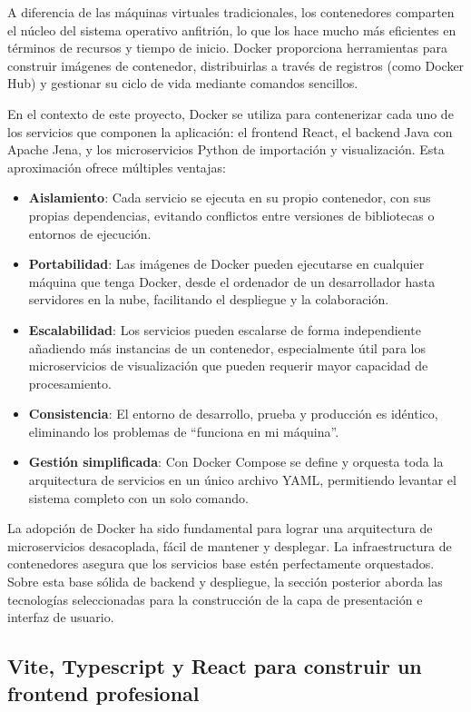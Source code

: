 \documentclass{article}
\begin{document}
A diferencia de las máquinas virtuales tradicionales, los contenedores comparten el núcleo del sistema operativo anfitrión, lo que los hace mucho más eficientes en términos de recursos y tiempo de inicio. Docker proporciona herramientas para construir imágenes de contenedor, distribuirlas a través de registros (como Docker Hub) y gestionar su ciclo de vida mediante comandos sencillos.

En el contexto de este proyecto, Docker se utiliza para contenerizar cada uno de los servicios que componen la aplicación: el frontend React, el backend Java con Apache Jena, y los microservicios Python de importación y visualización. Esta aproximación ofrece múltiples ventajas:

\begin{itemize}
    \item \textbf{Aislamiento}: Cada servicio se ejecuta en su propio contenedor, con sus propias dependencias, evitando conflictos entre versiones de bibliotecas o entornos de ejecución.
    \item \textbf{Portabilidad}: Las imágenes de Docker pueden ejecutarse en cualquier máquina que tenga Docker, desde el ordenador de un desarrollador hasta servidores en la nube, facilitando el despliegue y la colaboración.
    \item \textbf{Escalabilidad}: Los servicios pueden escalarse de forma independiente añadiendo más instancias de un contenedor, especialmente útil para los microservicios de visualización que pueden requerir mayor capacidad de procesamiento.
    \item \textbf{Consistencia}: El entorno de desarrollo, prueba y producción es idéntico, eliminando los problemas de “funciona en mi máquina”.
    \item \textbf{Gestión simplificada}: Con Docker Compose se define y orquesta toda la arquitectura de servicios en un único archivo YAML, permitiendo levantar el sistema completo con un solo comando.
\end{itemize}

La adopción de Docker ha sido fundamental para lograr una arquitectura de microservicios desacoplada, fácil de mantener y desplegar. 
La infraestructura de contenedores asegura que los servicios base estén perfectamente orquestados. Sobre esta base sólida de backend y despliegue, la sección posterior aborda las tecnologías seleccionadas para la construcción de la capa de presentación e interfaz de usuario.

\subsection{Vite, Typescript y React para construir un frontend profesional}
\end{document}
